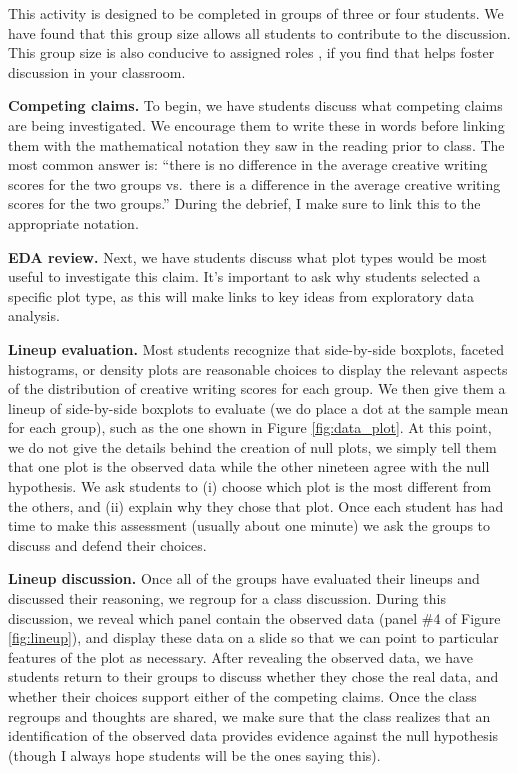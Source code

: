 \documentclass[12pt]{article}
\begin{document}
This activity is designed to be completed in groups of three or four
students. We have found that this group size allows all students to
contribute to the discussion. This group size is also conducive to
assigned roles \citep{Roseth2008-xx}, if you find that helps foster
discussion in your classroom.

\textbf{Competing claims.} To begin, we have students discuss what
competing claims are being investigated. We encourage them to write
these in words before linking them with the mathematical notation they
saw in the reading prior to class. The most common answer is: ``there is
no difference in the average creative writing scores for the two groups
vs.~there is a difference in the average creative writing scores for the
two groups.'' During the debrief, I make sure to link this to the
appropriate notation.

\textbf{EDA review.} Next, we have students discuss what plot types
would be most useful to investigate this claim. It's important to ask
why students selected a specific plot type, as this will make links to
key ideas from exploratory data analysis.

\textbf{Lineup evaluation.} Most students recognize that side-by-side
boxplots, faceted histograms, or density plots are reasonable choices to
display the relevant aspects of the distribution of creative writing
scores for each group. We then give them a lineup of side-by-side
boxplots to evaluate (we do place a dot at the sample mean for each
group), such as the one shown in Figure \ref{fig:data_plot}. At this
point, we do not give the details behind the creation of null plots, we
simply tell them that one plot is the observed data while the other
nineteen agree with the null hypothesis. We ask students to (i) choose
which plot is the most different from the others, and (ii) explain why
they chose that plot. Once each student has had time to make this
assessment (usually about one minute) we ask the groups to discuss and
defend their choices.

\textbf{Lineup discussion.} Once all of the groups have evaluated their
lineups and discussed their reasoning, we regroup for a class
discussion. During this discussion, we reveal which panel contain the
observed data (panel \#4 of Figure \ref{fig:lineup}), and display these
data on a slide so that we can point to particular features of the plot
as necessary. After revealing the observed data, we have students return
to their groups to discuss whether they chose the real data, and whether
their choices support either of the competing claims. Once the class
regroups and thoughts are shared, we make sure that the class realizes
that an identification of the observed data provides evidence against
the null hypothesis (though I always hope students will be the ones
saying this).
\end{document}

